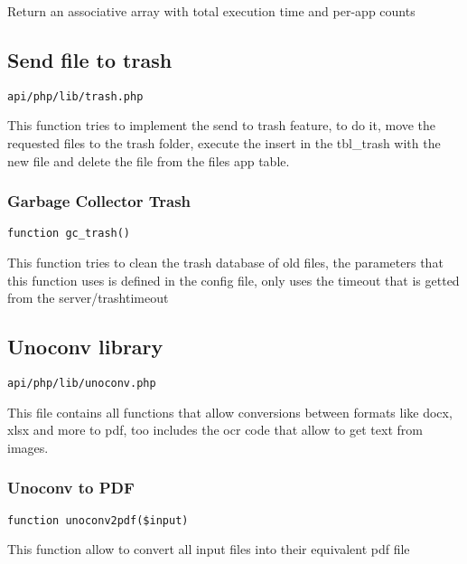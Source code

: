 \documentclass[a4paper]{article}
\begin{document}
Return an associative array with total execution time and per-app counts

\hypertarget{toc532}{}
\subsection{Send file to trash}

\begin{lstlisting}
api/php/lib/trash.php
\end{lstlisting}

This function tries to implement the send to trash feature, to do it, move the
requested files to the trash folder, execute the insert in the tbl\_trash with
the new file and delete the file from the files app table.

\hypertarget{toc533}{}
\subsubsection{Garbage Collector Trash}

\begin{lstlisting}
function gc_trash()
\end{lstlisting}

This function tries to clean the trash database of old files, the parameters
that this function uses is defined in the config file, only uses the timeout
that is getted from the server/trashtimeout

\hypertarget{toc534}{}
\subsection{Unoconv library}

\begin{lstlisting}
api/php/lib/unoconv.php
\end{lstlisting}

This file contains all functions that allow conversions between formats like
docx, xlsx and more to pdf, too includes the ocr code that allow to get text
from images.

\hypertarget{toc535}{}
\subsubsection{Unoconv to PDF}

\begin{lstlisting}
function unoconv2pdf($input)
\end{lstlisting}

This function allow to convert all input files into their equivalent pdf file
\end{document}
